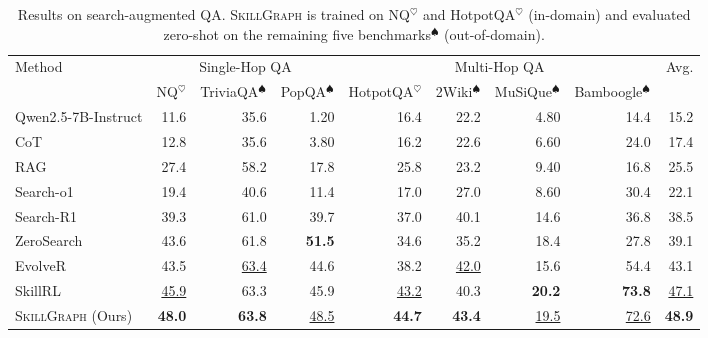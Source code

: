 
\begin{table}[t]
    \caption{Results on search-augmented QA. \textsc{SkillGraph} is trained on NQ$^\heartsuit$ and HotpotQA$^\heartsuit$ (in-domain) and evaluated zero-shot on the remaining five benchmarks$^\spadesuit$ (out-of-domain).}
    \label{tab:qa}
    \centering
    \footnotesize
    \setlength{\tabcolsep}{3pt}
    \begin{tabular}{lrrr|rrrr|r}
    \toprule
    \multirow{2}{*}{Method} & \multicolumn{3}{c|}{Single-Hop QA} & \multicolumn{4}{c|}{Multi-Hop QA} & \multirow{2}{*}{Avg.} \\
     & NQ$^\heartsuit$ & TriviaQA$^\spadesuit$ & PopQA$^\spadesuit$ & HotpotQA$^\heartsuit$ & 2Wiki$^\spadesuit$ & MuSiQue$^\spadesuit$ & Bamboogle$^\spadesuit$ & \\
    \midrule
    Qwen2.5-7B-Instruct  & 11.6 & 35.6 &  1.20 & 16.4 & 22.2 &  4.80 & 14.4 & 15.2 \\
    CoT   & 12.8 & 35.6 &  3.80 & 16.2 & 22.6 &  6.60 & 24.0 & 17.4 \\
    RAG      & 27.4 & 58.2 & 17.8  & 25.8 & 23.2 &  9.40 & 16.8 & 25.5 \\
    Search-o1 & 19.4 & 40.6 & 11.4  & 17.0 & 27.0 &  8.60 & 30.4 & 22.1 \\
    Search-R1         & 39.3 & 61.0 & 39.7  & 37.0 & 40.1 & 14.6  & 36.8 & 38.5 \\
    ZeroSearch        & 43.6 & 61.8 & \textbf{51.5}  & 34.6 & 35.2 & 18.4  & 27.8 & 39.1 \\
    EvolveR           & 43.5 & \underline{63.4} & 44.6  & 38.2 & \underline{42.0} & 15.6  & 54.4 & 43.1 \\
    SkillRL           & \underline{45.9} & 63.3 & 45.9  & \underline{43.2} & 40.3 & \textbf{20.2}  & \textbf{73.8} & \underline{47.1} \\
    \midrule
    \textsc{SkillGraph} (Ours) & \textbf{48.0} & \textbf{63.8} & \underline{48.5} & \textbf{44.7} & \textbf{43.4} & \underline{19.5} & \underline{72.6} & \textbf{48.9} \\
    \bottomrule
    \end{tabular}
    \end{table}